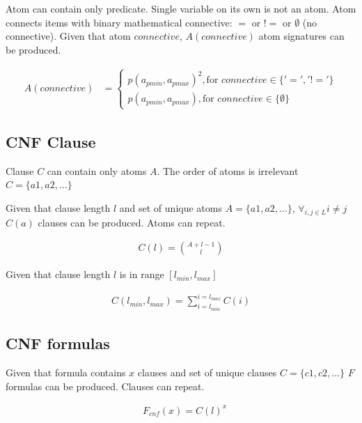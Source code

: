 Atom can contain only predicate. Single variable on its own is not an atom. Atom connects items with binary mathematical connective: $=$ or $!=$ or $\emptyset$ (no connective).
Given that atom $connective$, $A(connective)$ atom signatures can be produced.

\begin{align}
	A(connective) &= 
  \begin{cases}
    p(a_{pmin}, a_{pmax})^{2}, \text{for } connective \in \{'=', '!='\} \\
    p(a_{pmin}, a_{pmax}), \text{for } connective \in \{\emptyset\} \label{eq:atom}
  \end{cases}
\end{align}

%
%

\subsection{CNF Clause}

Clause $C$ can contain only atoms $A$. The order of atoms is irrelevant $C = \{a1, a2, \dots\}$

Given that 
clause length $l$ and 
set of unique atoms $A = \{a1, a2, \dots\}$, $\forall_{i,j \in L} i \neq j$
$C(a)$ clauses can be produced. Atoms can repeat.

\begin{align}
  C(l) = \binom{A + l - 1}{l}
\end{align}

Given that clause length $l$ is in range $[l_{min}, l_{max}]$

\begin{align}
  C(l_{min}, l_{max}) = \sum_{i=l_{min}}^{i=l_{max}} C(i) \label{eq:clause}
\end{align}

\subsection{CNF formulas}

Given that
formula contains $x$ clauses and
set of unique clauses $C = \{c1,c2, \dots\}$
$F$ formulas can be produced. Clauses can repeat.

\begin{align}
  &F_{cnf}(x) = C(l)^{x} \label{eq:cnfformula}
\end{align}
